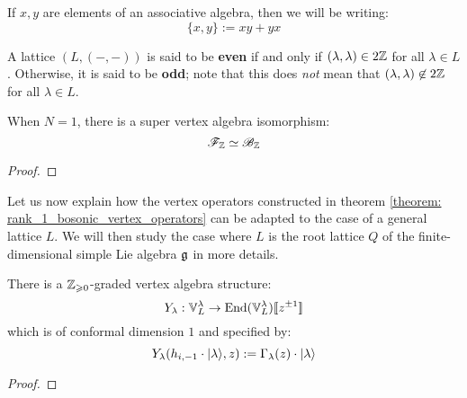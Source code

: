         \begin{convention}
            If $x, y$ are elements of an associative algebra, then we will be writing:
                $$\{x, y\} := xy + yx$$
        \end{convention}


        \begin{definition} \label{def: even_and_odd_lattices}
            A lattice $(L, (-, -))$ is said to be \textbf{even} if and only if $(\lambda, \lambda) \in 2\mathbb{Z}$ for all $\lambda \in L$. Otherwise, it is said to be \textbf{odd}; note that this does \textit{not} mean that $(\lambda, \lambda) \not \in 2\mathbb{Z}$ for all $\lambda \in L$.
        \end{definition}
        \begin{definition} \label{def: lattice_clifford_(super)_algebras}
             
        \end{definition}
        
        \begin{theorem}  \label{theorem: boson_fermion_correspondence}
            When $N = 1$, there is a super vertex algebra isomorphism:
                $$\mathscr{F}_{\mathbb{Z}} \simeq \mathscr{B}_{\mathbb{Z}}$$
        \end{theorem}
            \begin{proof}
                
            \end{proof}
                
        Let us now explain how the vertex operators constructed in theorem \ref{theorem: rank_1_bosonic_vertex_operators} can be adapted to the case of a general lattice $L$. We will then study the case where $L$ is the root lattice $Q$ of the finite-dimensional simple Lie algebra $\mathfrak{g}$ in more details.

        \begin{proposition} \label{prop: VA_structures_on_general_weyl_vacuum_modules}
            There is a $\mathbb{Z}_{\geqslant 0}$-graded vertex algebra structure:
                $$Y_{\lambda}: \mathbb{V}_L^{\lambda} \to \mathrm{End}( \mathbb{V}_L^{\lambda} )[\![z^{\pm 1}]\!]$$
            which is of conformal dimension $1$ and specified by:
                $$Y_{\lambda}( h_{i, -1} \cdot \lvert {\lambda} \rangle, z ) := \Gamma_{\lambda}(z) \cdot \lvert {\lambda} \rangle$$
        \end{proposition}
            \begin{proof}
                
            \end{proof}

